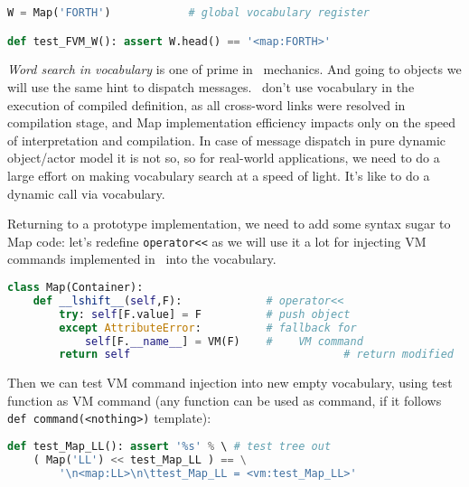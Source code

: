 \clearpage{}\label{vocab}

\begin{lstlisting}[language=Python]
W = Map('FORTH')			# global vocabulary register

def test_FVM_W(): assert W.head() == '<map:FORTH>'
\end{lstlisting}

\emph{Word search in vocabulary} is one of prime in \F\ mechanics. And going to
objects we will use the same hint to dispatch messages. \F\ don't use vocabulary
in the execution of compiled definition, as all cross-word links were resolved
in compilation stage, and Map implementation efficiency impacts only on the
speed of interpretation and compilation. In case of message dispatch in pure
dynamic object/actor model it is not so, so for real-world applications, we need
to do a large effort on making vocabulary search at a speed of light. It's like
to do a dynamic call via vocabulary.

\bigskip
Returning to a prototype implementation, we need to add some syntax sugar to Map
code: let's redefine \verb|operator<<| as we will use it a lot for injecting VM
commands implemented in \py\ into the vocabulary.

\begin{lstlisting}[language=Python]
class Map(Container):
	def __lshift__(self,F):				# operator<<
		try: self[F.value] = F			# push object
		except AttributeError:			# fallback for 
			self[F.__name__] = VM(F)	#    VM command
		return self									# return modified
\end{lstlisting}
\clearpage\noindent
Then we can test VM command injection into new empty vocabulary, using test
function as VM command (any function can be used as command, if it follows  
\verb|def command(<nothing>)| template):
\begin{lstlisting}[language=Python]
def test_Map_LL(): assert '%s' % \ # test tree out
	( Map('LL') << test_Map_LL ) == \
		'\n<map:LL>\n\ttest_Map_LL = <vm:test_Map_LL>'
\end{lstlisting}
